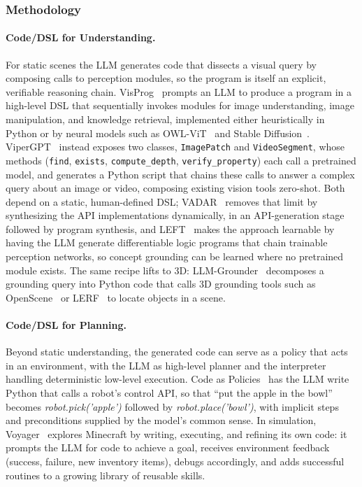 \subsubsection{Methodology}

\paragraph{Code/DSL for Understanding.}
For static scenes the LLM generates code that dissects a visual query by composing calls to perception modules, so the program is itself an explicit, verifiable reasoning chain.
VisProg~\cite{gupta2023visual} prompts an LLM to produce a program in a high-level DSL that sequentially invokes modules for image understanding, image manipulation, and knowledge retrieval, implemented either heuristically in Python or by neural models such as OWL-ViT~\cite{minderer2022simple} and Stable Diffusion~\cite{rombach2022ldm}.
ViperGPT~\cite{suris2023vipergpt} instead exposes two classes, \texttt{ImagePatch} and \texttt{VideoSegment}, whose methods (\texttt{find}, \texttt{exists}, \texttt{compute\_depth}, \texttt{verify\_property}) each call a pretrained model, and generates a Python script that chains these calls to answer a complex query about an image or video, composing existing vision tools zero-shot.
Both depend on a static, human-defined DSL; VADAR~\cite{marsili2025visual} removes that limit by synthesizing the API implementations dynamically, in an API-generation stage followed by program synthesis, and LEFT~\cite{hsu2023s} makes the approach learnable by having the LLM generate differentiable logic programs that chain trainable perception networks, so concept grounding can be learned where no pretrained module exists.
The same recipe lifts to 3D: LLM-Grounder~\cite{yang2024llmgrounder} decomposes a grounding query into Python code that calls 3D grounding tools such as OpenScene~\cite{peng2023openscene} or LERF~\cite{kerr2023lerf} to locate objects in a scene.

\paragraph{Code/DSL for Planning.}
Beyond static understanding, the generated code can serve as a policy that acts in an environment, with the LLM as high-level planner and the interpreter handling deterministic low-level execution.
Code as Policies~\cite{liang2023code} has the LLM write Python that calls a robot's control API, so that ``put the apple in the bowl'' becomes \textit{robot.pick('apple')} followed by \textit{robot.place('bowl')}, with implicit steps and preconditions supplied by the model's common sense.
In simulation, Voyager~\cite{wang2023voyager} explores Minecraft by writing, executing, and refining its own code: it prompts the LLM for code to achieve a goal, receives environment feedback (success, failure, new inventory items), debugs accordingly, and adds successful routines to a growing library of reusable skills.


